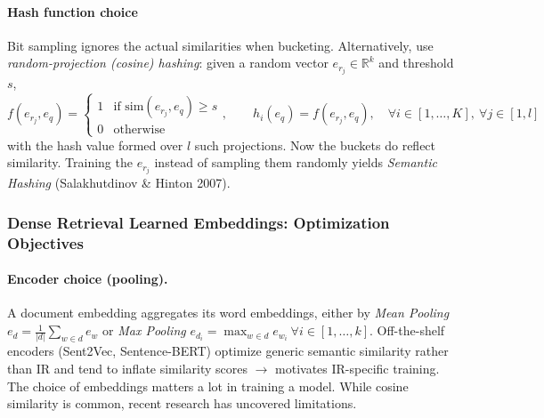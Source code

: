 \documentclass{article}
\begin{document}
\paragraph{Hash function choice} Bit sampling ignores the actual similarities when bucketing. Alternatively, use \textit{random-projection (cosine) hashing}: given a random vector $e_{r_j}\in\mathbb{R}^k$ and threshold $s$,
$$
f(e_{r_j}, e_q)= \begin{cases} 1 & \text{if } \text{sim}(e_{r_j}, e_q)\geq s \\ 0 & \text{otherwise}\end{cases}, \qquad h_i(e_q)=f(e_{r_j}, e_q), \quad \forall i \in [1,\dots,K], \ \forall j \in [1,l]
$$
with the hash value formed over $l$ such projections. Now the buckets do reflect similarity. Training the $e_{r_j}$ instead of sampling them randomly yields \textit{Semantic Hashing} (Salakhutdinov \& Hinton 2007).

\subsubsection{Dense Retrieval Learned Embeddings: Optimization Objectives}
\paragraph{Encoder choice (pooling).} A document embedding aggregates its word embeddings, either by \textit{Mean Pooling} $e_d=\frac{1}{|d|}\sum_{w\in d}e_w$ or \textit{Max Pooling} $e_{d_i}=\max_{w\in d}e_{w_i}\ \forall i\in[1,\dots,k]$. Off-the-shelf encoders (Sent2Vec, Sentence-BERT) optimize generic semantic similarity rather than IR and tend to inflate similarity scores $\rightarrow$ motivates IR-specific training.\\

The choice of embeddings matters a lot in training a model. While cosine similarity is common, recent research has uncovered limitations.
\end{document}
